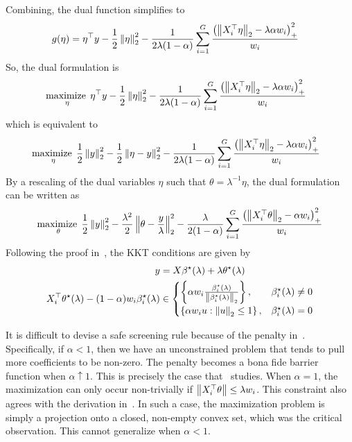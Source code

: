 Combining, the dual function simplifies to
\begin{align*}
    g(\eta)
    &=
    \eta^\top y 
    - \frac{1}{2} \left\|\eta\right\|_2^2
    -\frac{1}{2\lambda (1-\alpha)}
    \sum\limits_{i=1}^G
    \frac{\left(\left\|X_i^\top \eta\right\|_2 - \lambda \alpha w_i\right)_+^2}{w_i}
\end{align*}
So, the dual formulation is
\begin{align*}
    &\operatorname*{maximize\;}\limits_{\eta} 
    \eta^\top y 
    - \frac{1}{2} \left\|\eta\right\|_2^2
    -\frac{1}{2\lambda (1-\alpha)}
    \sum\limits_{i=1}^G
    \frac{\left(\left\|X_i^\top \eta\right\|_2 - \lambda \alpha w_i\right)_+^2}{w_i}
\end{align*}
which is equivalent to
\begin{align*}
    &\operatorname*{maximize\;}\limits_{\eta} 
    \frac{1}{2} \left\|y\right\|_2^2
    - \frac{1}{2} \left\|\eta-y\right\|_2^2
    -\frac{1}{2\lambda (1-\alpha)}
    \sum\limits_{i=1}^G
    \frac{\left(\left\|X_i^\top \eta\right\|_2 - \lambda \alpha w_i\right)_+^2}{w_i}
\end{align*}
By a rescaling of the dual variables $\eta$ such that $\theta = \lambda^{-1} \eta$,
the dual formulation can be written as 
\begin{align}
    \operatorname*{maximize\;}\limits_{\theta} 
    \frac{1}{2} \left\|y\right\|_2^2
    - \frac{\lambda^2}{2} \left\|\theta-\frac{y}{\lambda}\right\|_2^2
    -\frac{\lambda}{2(1-\alpha)}
    \sum\limits_{i=1}^G
    \frac{\left(\left\|X_i^\top \theta\right\|_2 - \alpha w_i\right)_+^2}{w_i}
    \label{eq:appendix:edpp:final}
\end{align}
Following the proof in~\citet[Appendix B.2]{wang:2015},
the KKT conditions are given by
\begin{align*}
    y &= X\beta^\star(\lambda) + \lambda \theta^\star(\lambda) \\
    X_i^\top \theta^\star(\lambda) - (1-\alpha) w_i \beta^\star_i(\lambda)
    &\in
    \begin{cases}
        \left\{\alpha w_i \frac{\beta_i^\star(\lambda)}{\left\|\beta_i^\star(\lambda)\right\|_2}\right\} ,& \beta_i^\star(\lambda) \neq 0 \\
        \left\{\alpha w_i u : \left\|u\right\|_2 \leq 1\right\} ,& \beta_i^\star(\lambda) = 0 
    \end{cases}
\end{align*}

It is difficult to devise a safe screening rule because of the penalty in~.
Specifically, if $\alpha < 1$, then we have an unconstrained problem that tends to pull more coefficients to be non-zero.
The penalty becomes a bona fide barrier function when $\alpha \uparrow 1$.
This is precisely the case that~\citet{wang:2015} studies.
When $\alpha = 1$, the maximization can only occur non-trivially if 
$\left\|X_i^\top \theta\right\| \leq \lambda w_i$.
This constraint also agrees with the derivation in~\citet{wang:2015}.
In such a case, the maximization problem is simply a projection onto a closed, non-empty convex set,
which was the critical observation.
This cannot generalize when $\alpha < 1$.

